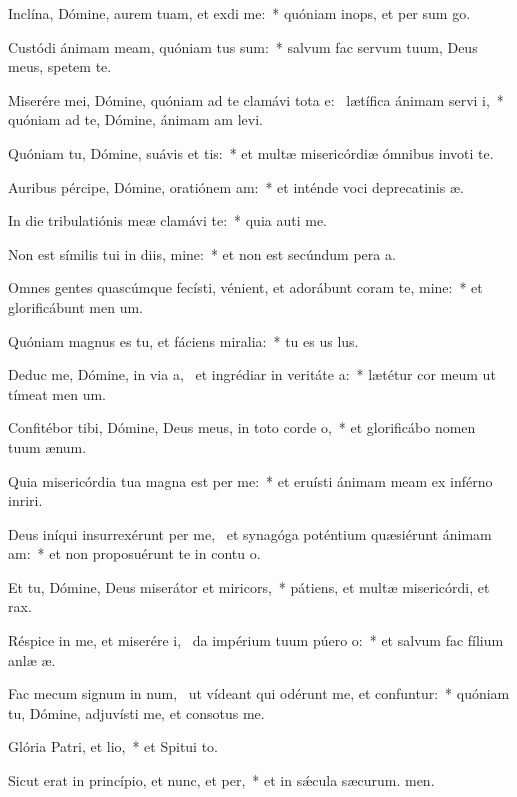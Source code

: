 \item Inclína, Dómine, aurem tuam, et exdi me:~* quóniam inops, et per sum go.
\item Custódi ánimam meam, quóniam tus sum:~* salvum fac servum tuum, Deus meus, spetem  te.
\item Miserére mei, Dómine, quóniam ad te clamávi tota e:~\pscross{} lætífica ánimam servi i,~* quóniam ad te, Dómine, ánimam am levi.
\item Quóniam tu, Dómine, suávis et tis:~* et multæ misericórdiæ ómnibus invoti te.
\item Auribus pércipe, Dómine, oratiónem am:~* et inténde voci deprecatinis æ.
\item In die tribulatiónis meæ clamávi  te:~* quia auti me.
\item Non est símilis tui in diis, mine:~* et non est secúndum pera a.
\item Omnes gentes quascúmque fecísti, vénient, et adorábunt coram te, mine:~* et glorificábunt men um.
\item Quóniam magnus es tu, et fáciens miralia:~* tu es us lus.
\item Deduc me, Dómine, in via a,~\pscross{} et ingrédiar in veritáte a:~* lætétur cor meum ut tímeat men um.
\item Confitébor tibi, Dómine, Deus meus, in toto corde o,~* et glorificábo nomen tuum  ænum.
\item Quia misericórdia tua magna est per me:~* et eruísti ánimam meam ex inférno inriri.
\item Deus iníqui insurrexérunt per me,~\pscross{} et synagóga poténtium quæsiérunt ánimam am:~* et non proposuérunt te in contu o.
\item Et tu, Dómine, Deus miserátor et miricors,~* pátiens, et multæ misericórdi, et rax.
\item Réspice in me, et miserére i,~\pscross{} da impérium tuum púero o:~* et salvum fac fílium anlæ æ.
\item Fac mecum signum in num,~\pscross{} ut vídeant qui odérunt me, et confuntur:~* quóniam tu, Dómine, adjuvísti me, et consotus  me.
\item Glória Patri, et lio,~* et Spitui to.
\item Sicut erat in princípio, et nunc, et per,~* et in sǽcula sæcurum. men.

